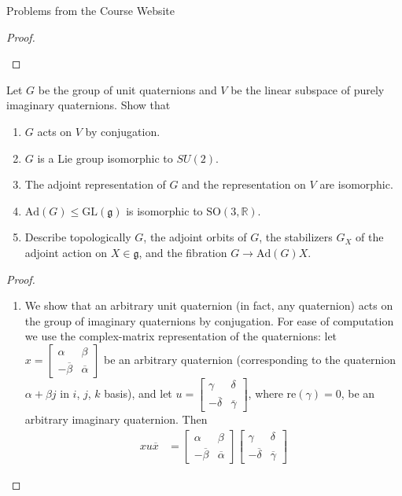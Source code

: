 \documentclass[12pt]{article}
\newcommand{\R}{\mathbb{R}}
\theoremstyle{definition}
\newenvironment{problem}[2][Problem]{\begin{trivlist}
\item[\hskip \labelsep {\bfseries #1}\hskip \labelsep {\bfseries #2.}]}{\end{trivlist}}
\begin{document}
\begin{section}{Problems from the Course Website}
\begin{problem}{2}
\begin{proof}
\begin{enumerate}[label=(\alph*)]
			\end{enumerate}
		\end{proof}
	\end{problem}
	\begin{problem}{3}
		Let $G$ be the group of unit quaternions and $V$ be the linear subspace of purely imaginary quaternions. Show that 
		\begin{enumerate}[label=(\alph*)]
			\item $G$ acts on $V$ by conjugation.
			\item $G$ is a Lie group isomorphic to $SU(2)$.
			\item The adjoint representation of $G$ and the representation on $V$ are isomorphic.
			\item $\text{Ad}(G)\leq \text{GL}(\mathfrak g)$ is isomorphic to $\text{SO}(3, \R)$.
			\item Describe topologically $G$, the adjoint orbits of $G$, the stabilizers $G_X$ of the adjoint action on $X \in \mathfrak g$, and the fibration $G \to \text{Ad}(G)X$.
		\end{enumerate}
		\begin{proof}
			\begin{enumerate}[label=(\alph*)]
				\item We show that an arbitrary unit quaternion (in fact, any quaternion) acts on the group of imaginary quaternions by conjugation. For ease of computation we use the complex-matrix representation of the quaternions: let $x = \begin{bmatrix}
						\alpha & \beta \\
						 -\overline \beta & \overline \alpha
					\end{bmatrix}$ be an arbitrary quaternion (corresponding to the quaternion $\alpha + \beta j$ in $i$,  $j$, $k$ basis), and let $u = \begin{bmatrix}
						\gamma & \delta \\
						-\overline \delta & \overline \gamma
					\end{bmatrix}$, where $\text{re}(\gamma) = 0$, be an arbitrary imaginary quaternion. Then
					\begin{align*}
						xu\overline x &= \begin{bmatrix}
						\alpha & \beta \\
						 -\overline \beta & \overline \alpha
					\end{bmatrix}\begin{bmatrix}
						\gamma & \delta \\
						-\overline \delta & \overline \gamma

\end{bmatrix}
\end{align*}
\end{enumerate}
\end{proof}
\end{problem}
\end{section}
\end{document}

